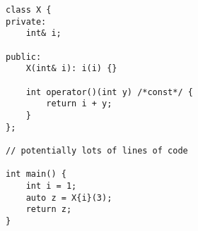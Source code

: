 \begin{lstlisting}[title=\href{https://godbolt.org/z/3ycaAW}{\texttt{godbolt.org/z/3ycaAW}}]
class X {
private:
    int& i;

public:
    X(int& i): i(i) {}

    int operator()(int y) /*const*/ {
        return i + y;
    }
};

// potentially lots of lines of code

int main() {
    int i = 1;
    auto z = X{i}(3);
    return z;
}
\end{lstlisting}
